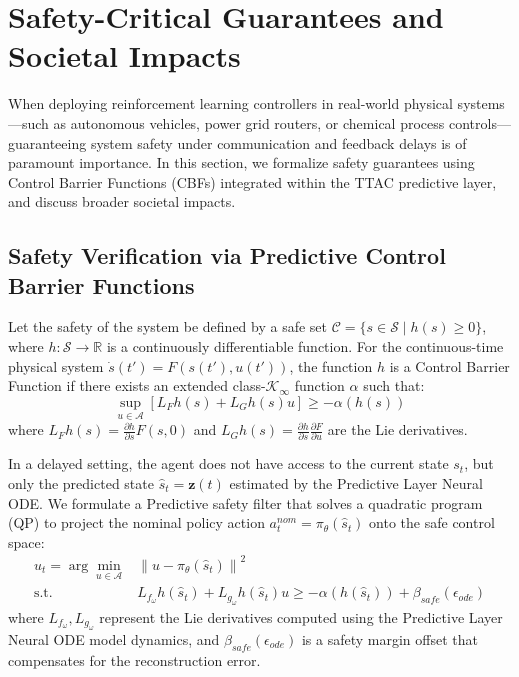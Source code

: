 \documentclass[manuscript, screen, review]{jair}
\begin{document}
\section{Safety-Critical Guarantees and Societal Impacts}\label{app:sec_safety}
When deploying reinforcement learning controllers in real-world physical systems—such as autonomous vehicles, power grid routers, or chemical process controls—guaranteeing system safety under communication and feedback delays is of paramount importance. In this section, we formalize safety guarantees using Control Barrier Functions (CBFs) integrated within the TTAC predictive layer, and discuss broader societal impacts.

\subsection{Safety Verification via Predictive Control Barrier Functions}\label{app:sub_safety_verification}
Let the safety of the system be defined by a safe set $\mathcal{C} = \{ s \in \mathcal{S} \mid h(s) \ge 0 \}$, where $h: \mathcal{S} \to \mathbb{R}$ is a continuously differentiable function. For the continuous-time physical system $\dot{s}(t') = F(s(t'), u(t'))$, the function $h$ is a Control Barrier Function if there exists an extended class-$\mathcal{K}_\infty$ function $\alpha$ such that:
\begin{equation}
    \sup_{u \in \mathcal{A}} \left[ L_F h(s) + L_G h(s) u \right] \ge -\alpha(h(s))
\end{equation}
where $L_F h(s) = \frac{\partial h}{\partial s} F(s, 0)$ and $L_G h(s) = \frac{\partial h}{\partial s} \frac{\partial F}{\partial u}$ are the Lie derivatives.

In a delayed setting, the agent does not have access to the current state $s_t$, but only the predicted state $\hat{s}_t = \mathbf{z}(t)$ estimated by the Predictive Layer Neural ODE. We formulate a Predictive safety filter that solves a quadratic program (QP) to project the nominal policy action $a^{nom}_t = \pi_\theta(\hat{s}_t)$ onto the safe control space:
\begin{align}
    u_t = \arg\min_{u \in \mathcal{A}} & \left\| u - \pi_\theta(\hat{s}_t) \right\|^2 \\
    \text{s.t. } & L_{f_\omega} h(\hat{s}_t) + L_{g_\omega} h(\hat{s}_t) u \ge -\alpha(h(\hat{s}_t)) + \beta_{safe}(\epsilon_{ode})
\end{align}
where $L_{f_\omega}, L_{g_\omega}$ represent the Lie derivatives computed using the Predictive Layer Neural ODE model dynamics, and $\beta_{safe}(\epsilon_{ode})$ is a safety margin offset that compensates for the reconstruction error.
\end{document}
